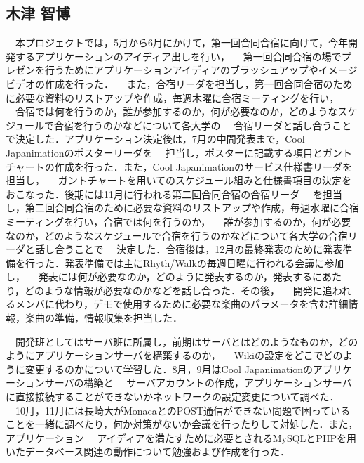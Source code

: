 \subsection{木津 智博}
\par
　本プロジェクトでは，5月から6月にかけて，第一回合同合宿に向けて，今年開発するアプリケーションのアイディア出しを行い，
　第一回合同合宿の場でプレゼンを行うためにアプリケーションアイディアのブラッシュアップやイメージビデオの作成を行った．
　また，合宿リーダを担当し，第一回合同合宿のために必要な資料のリストアップや作成，毎週木曜に合宿ミーティングを行い，
　合宿では何を行うのか，誰が参加するのか，何が必要なのか，どのようなスケジュールで合宿を行うのかなどについて各大学の
　合宿リーダと話し合うことで決定した．アプリケーション決定後は，7月の中間発表まで，Cool Japanimationのポスターリーダを
　担当し，ポスターに記載する項目とガントチャートの作成を行った．また，Cool Japanimationのサービス仕様書リーダを担当し，
　ガントチャートを用いてのスケジュール組みと仕様書項目の決定をおこなった．後期には11月に行われる第二回合同合宿の合宿リーダ
　を担当し，第二回合同合宿のために必要な資料のリストアップや作成，毎週水曜に合宿ミーティングを行い，合宿では何を行うのか，
　誰が参加するのか，何が必要なのか，どのようなスケジュールで合宿を行うのかなどについて各大学の合宿リーダと話し合うことで
　決定した．合宿後は，12月の最終発表のために発表準備を行った．発表準備では主にRhyth/Walkの毎週日曜に行われる会議に参加し，
　発表には何が必要なのか，どのように発表するのか，発表するにあたり，どのような情報が必要なのかなどを話し合った．その後，
　開発に追われるメンバに代わり，デモで使用するために必要な楽曲のパラメータを含む詳細情報，楽曲の準備，情報収集を担当した．
\par
　開発班としてはサーバ班に所属し，前期はサーバとはどのようなものか，どのようにアプリケーションサーバを構築するのか，
　Wikiの設定をどこでどのように変更するのかについて学習した．8月，9月はCool Japanimationのアプリケーションサーバの構築と
　サーバアカウントの作成，アプリケーションサーバに直接接続することができないかネットワークの設定変更について調べた．
　10月，11月には長崎大がMonacaとのPOST通信ができない問題で困っていることを一緒に調べたり，何か対策がないか会議を行ったりして対処した．また，アプリケーション
　アイディアを満たすために必要とされるMySQLとPHPを用いたデータベース関連の動作について勉強および作成を行った．
\par

